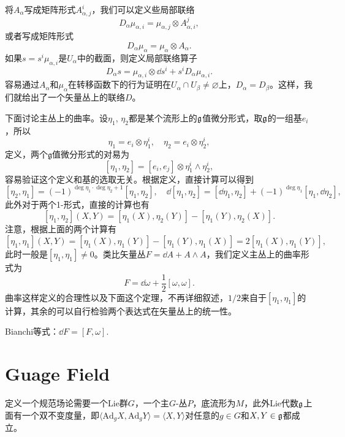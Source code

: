 将$A_\alpha$写成矩阵形式$A^i_{\alpha,j}$，我们可以定义些局部联络
\[
	D_\alpha\mu_{\alpha,i}=\mu_{\alpha,j}\otimes A^j_{\alpha,i},
\]
或者写成矩阵形式
\[
	D_\alpha\mu_{\alpha}=\mu_{\alpha}\otimes A_\alpha.
\]
如果$s=s^i\mu_{\alpha,i}$是$U_\alpha$中的截面，则定义局部联络算子
\[
	D_\alpha s=\mu_{\alpha,i}\otimes \dd s^i+s^iD_\alpha\mu_{\alpha,i}.
\]
容易通过$A_\alpha$和$\mu_\alpha$在转移函数下的行为证明在$U_\alpha\cap U_\beta\neq \varnothing$上，$D_\alpha=D_\beta$。这样，我们就给出了一个矢量丛上的联络$D$。

下面讨论主丛上的曲率。设$\eta_1$, $\eta_2$都是某个流形上的$\mathfrak{g}$值微分形式，取$\mathfrak{g}$的一组基$e_i$，所以
\[
	\eta_1=e_i\otimes \eta_1^i,\quad \eta_2=e_i\otimes \eta_2^i,
\]
定义，两个$\mathfrak{g}$值微分形式的对易为
\[
	[\eta_1,\eta_2]=[e_i,e_j]\otimes \eta_1^i\wedge\eta_2^i,
\]
容易验证这个定义和基的选取无关。根据定义，直接计算可以得到
\[
	[\eta_2,\eta_1]=(-1)^{\deg \eta_1\cdot \deg \eta_2+1}[\eta_1,\eta_2],\quad \dd[\eta_1,\eta_2]=[\dd\eta_1,\eta_2]+(-1)^{\deg \eta_1}[\eta_1,\dd\eta_2],
\]
此外对于两个1-形式，直接的计算也有
\[
	[\eta_1,\eta_2](X,Y)=[\eta_1(X),\eta_2(Y)]-[\eta_1(Y),\eta_2(X)].
\]
注意，根据上面的两个计算有
\[
	[\eta_1,\eta_1](X,Y)=[\eta_1(X),\eta_1(Y)]-[\eta_1(Y),\eta_1(X)]=2[\eta_1(X),\eta_1(Y)],
\]
此时一般是$[\eta_1,\eta_1]\neq 0$。类比矢量丛$F=\dd A+A\wedge A$，我们定义主丛上的曲率形式为
\[
	F=\dd \omega+\frac{1}{2}[\omega,\omega].
\]
曲率这样定义的合理性以及下面这个定理，不再详细叙述，$1/2$来自于$[\eta_1,\eta_1]$的计算，其余的可以自行检验两个表达式在矢量丛上的统一性。

\para Bianchi等式：$\dd F=[F,\omega]$.


\section{Guage Field}
定义一个规范场论需要一个Lie群$G$，一个主$G$-丛$P$，底流形为$M$，此外Lie代数$\mathfrak{g}$上面有一个双不变度量，即$\langle \mathrm{Ad}_gX,\mathrm{Ad}_gY\rangle=\langle X,Y\rangle$对任意的$g\in G$和$X,Y\in \mathfrak{g}$都成立。

